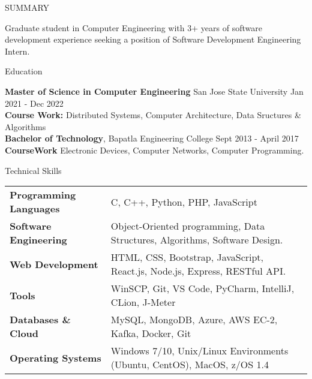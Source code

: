 \documentclass{resume} %
\begin{document}

\begin{rSection}{SUMMARY}

{Graduate student in Computer Engineering with 3+ years of  software development experience seeking a position of Software Development Engineering Intern.}


\end{rSection}
\vspace{-0.5em}
\begin{rSection}{Education}

{\bf Master of Science in Computer Engineering} {San Jose State University} \hfill {Jan 2021 - Dec 2022}\\
{\bf Course Work: }Distributed Systems, Computer Architecture, Data Sructures \& Algorithms\\
{\bf Bachelor of Technology}, Bapatla Engineering College \hfill {Sept 2013 - April 2017}\\
{\bf CourseWork} Electronic Devices, Computer Networks, Computer Programming.  
\end{rSection}

\vspace{-0.5em}
\begin{rSection}{Technical Skills}
\begin{tabular}{ @{} >{\bfseries}l @{\hspace{1ex}} l }
Programming Languages & C, C++, Python, PHP, JavaScript\\
Software Engineering & Object-Oriented programming, Data Structures, Algorithms, Software Design.\\
Web Development & HTML, CSS, Bootstrap, JavaScript, React.js, Node.js, Express, RESTful API.\\
Tools & WinSCP,  Git, VS Code, PyCharm, IntelliJ, CLion, J-Meter\\
Databases \& Cloud  & MySQL, MongoDB, Azure, AWS EC-2, Kafka, Docker, Git\\
Operating Systems & Windows 7/10, Unix/Linux Environments (Ubuntu, CentOS), MacOS, z/OS 1.4
\end{tabular}
\end{rSection}
\end{document}
